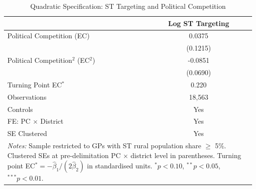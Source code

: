 \begin{table}[htbp]
\centering
\caption{Quadratic Specification: ST Targeting and Political Competition}
\label{tab:quadratic_st}
\begin{tabular}{lc}
\hline\hline
 & Log ST Targeting \\
\hline
Political Competition (EC) & 0.0375 \\
 & (0.1215) \\
Political Competition$^2$ (EC$^2$) & -0.0851 \\
 & (0.0690) \\
\hline
Turning Point EC$^*$ & 0.220 \\
Observations & 18,563 \\
Controls & Yes \\
FE: PC $\times$ District & Yes \\
SE Clustered & Yes \\
\hline\hline
\multicolumn{2}{p{9cm}}{\footnotesize \textit{Notes:} Sample restricted to GPs with ST rural population share $\geq$ 5\%. Clustered SEs at pre-delimitation PC $\times$ district level in parentheses. Turning point EC$^* = -\hat{\beta}_1 / (2\hat{\beta}_2)$ in standardised units. $^{*}p<0.10$, $^{**}p<0.05$, $^{***}p<0.01$.}
\end{tabular}
\end{table}